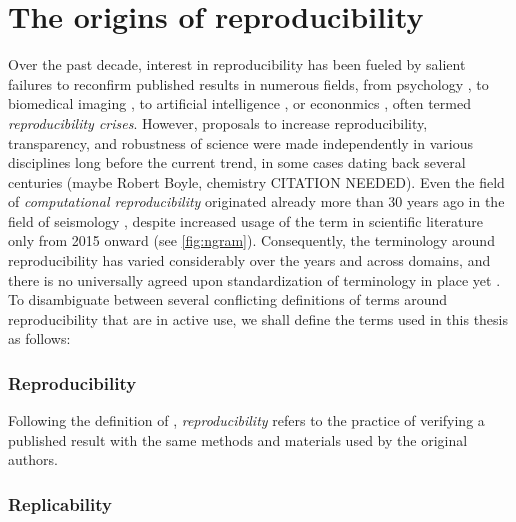 \section{The origins of reproducibility}

Over the past decade, interest in reproducibility has been fueled by salient failures to reconfirm published results in numerous fields, from psychology \citep{open2015estimating}, to biomedical imaging \citep{wagner202310}, to artificial intelligence \citep{hutson2018artificial}, or econonmics \citep{camerer2016evaluating}, often termed \textit{reproducibility crises}.
However, proposals to increase reproducibility, transparency, and robustness of science were made independently in various disciplines long before the current trend, in some cases dating back several centuries (maybe Robert Boyle, chemistry CITATION NEEDED).
Even the field of \textit{computational reproducibility} originated already more than 30 years ago in the field of seismology \citep{claerbout1992electronic} \citep{buckheit1995wavelab}, despite increased usage of the term in scientific literature only from 2015 onward (see \cref{fig:ngram}).
Consequently, the terminology around reproducibility has varied considerably over the years and across domains, and there is no universally agreed upon standardization of terminology in place yet \citep{barba2018terminologies}.
To disambiguate between several conflicting definitions of terms around reproducibility that are in active use, we shall define the terms used in this thesis as follows:

\subsubsection{Reproducibility}

Following the definition of \citet{peng2006}, \textit{reproducibility} refers to the practice of verifying a published result with the same methods and materials used by the original authors.

\subsubsection{Replicability}

